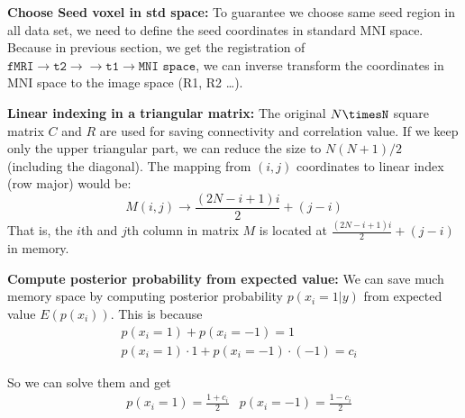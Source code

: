 \documentclass[12pt]{article}
\begin{document}
\textbf{Choose Seed voxel in std space: } To guarantee we choose same seed region in all data set, we need to define the seed coordinates in standard MNI space. Because in previous section, we get the registration of $\texttt{fMRI}\rightarrow \texttt{t2}\rightarrow\rightarrow \texttt{t1} \rightarrow \texttt{MNI space}$, we can inverse transform the coordinates in MNI space to the image space (R1, R2 \dots).

\textbf{Linear indexing in a triangular matrix: } The original $N\timesN$ square matrix $C$ and $R$ are used for saving connectivity and correlation value. If we keep only the upper triangular part, we can reduce the size to $N(N+1)/2$ (including the diagonal). The mapping from $(i,j)$ coordinates to linear index (row major) would be:
\begin{equation*}
  M(i,j) \rightarrow \frac{(2N-i+1)i}{2} + (j-i) 
\end{equation*}
That is, the $i$th and $j$th column in matrix $M$ is located at $ \frac{(2N-i+1)i}{2} + (j-i) $ in memory.

\textbf{Compute posterior probability from expected value: } We can save much memory space by computing posterior probability $p(x_i = 1 | y)$ from expected value $E(p(x_i))$. This is because
\begin{align*}
&   p(x_i = 1) + p(x_i = -1) = 1 \\
&   p(x_i = 1) \cdot 1 + p(x_i = -1) \cdot (-1) = c_i
\end{align*}

So we can solve them and get 
\begin{align*}
&  p(x_i = 1) = \frac{1 + c_i}{2} 
& p(x_i = -1) = \frac{1 - c_i}{2}
\end{align*}
\end{document}
